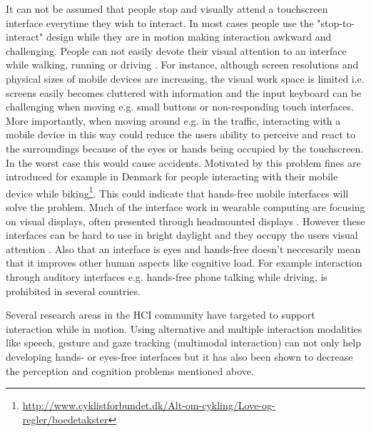 It can not be assumed that people stop and visually attend a touchscreen interface everytime they wish to interact. In most cases people use the "stop-to-interact" design while they are in motion making interaction awkward and challenging. People can not easily devote their visual attention to an interface while walking, running or driving \cite{brewster_overcoming_2002}. For instance, although screen resolutions and physical sizes of mobile devices are increasing, the visual work space is limited i.e. screens easily becomes cluttered with information and the input keyboard can be challenging when moving e.g. small buttons or non-responding touch interfaces. More importantly, when moving around e.g. in the traffic, interacting with a mobile device in this way could reduce the users ability to perceive and react to the surroundings because of the eyes or hands being occupied by the touchscreen. In the worst case this would cause accidents. Motivated by this problem fines are introduced for example in Denmark for people interacting with their mobile device while biking\footnote{\url{http://www.cyklistforbundet.dk/Alt-om-cykling/Love-og-regler/boedetakster}}. %
This could indicate that hands-free mobile interfaces will solve the problem. Much of the interface work in wearable computing are focusing on visual displays, often presented through headmounted displays \cite{barfield_fundamentals_2000}. However these interfaces can be hard to use in bright daylight and they occupy the users visual attention \cite{geelhoed_safety_2000}. Also that an interface is eyes and hands-free doesn't neccesarily mean that it improves other human aspects like cognitive load. For example interaction through auditory interfaces e.g. hands-free phone talking while driving, is prohibited in several countries.

Several research areas in the HCI community have targeted to support interaction while in motion. Using alternative and multiple interaction modalities like speech, gesture and gaze tracking (multimodal interaction) can not only help developing hands- or eyes-free interfaces but it has also been shown to decrease the perception and cognition problems mentioned above.

